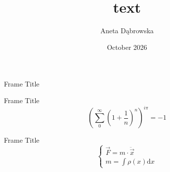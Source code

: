 \documentclass{beamer}
\title{text}
\author{Aneta Dąbrowska}
\date{October 2026}
\begin{document}
    \begin{frame}{Frame Title}
    \end{frame}
    
    \begin{frame}{Frame Title}
        $$\left(\sum\limits_0^\infty\left(1+\frac{1}{n}\right)^n\right)^{i\pi}=-1$$
    \end{frame}

    \begin{frame}{Frame Title}
        $$\begin{cases}{}
        \vec{F}=m\cdot\ddot\vec{x}\\
        m=\int\rho(x)\text{d}x
        \end{cases}$$
    \end{frame}
   
\end{document}
